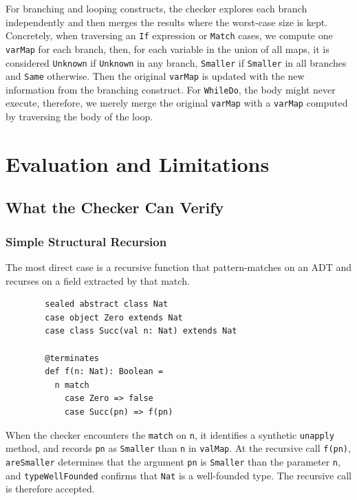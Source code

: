 For branching and looping constructs, the checker explores each branch
independently and then merges the results where the worst-case size is kept.
Concretely, when traversing an \texttt{If} expression or \texttt{Match} cases,
we compute one \texttt{varMap} for each branch, then, for each variable in the
union of all maps, it is considered \texttt{Unknown} if \texttt{Unknown} in
any branch, \texttt{Smaller} if \texttt{Smaller} in all branches and
\texttt{Same} otherwise. Then the original \texttt{varMap} is updated with the
new information from the branching construct.
For \texttt{WhileDo}, the body might never execute, therefore, we merely merge
the original \texttt{varMap} with a \texttt{varMap} computed by traversing the
body of the loop.


\chapter{Evaluation and Limitations}

\section{What the Checker Can Verify}

\subsection{Simple Structural Recursion}
The most direct case is a recursive function that pattern-matches on an ADT and
recurses on a field extracted by that match.
\begin{verbatim}
        sealed abstract class Nat
        case object Zero extends Nat
        case class Succ(val n: Nat) extends Nat

        @terminates
        def f(n: Nat): Boolean =
          n match
            case Zero => false
            case Succ(pn) => f(pn)
\end{verbatim}
When the checker encounters the \texttt{match} on \texttt{n}, it identifies a
synthetic \texttt{unapply} method, and records \texttt{pn} as \texttt{Smaller}
than \texttt{n} in \texttt{valMap}.
At the recursive call \texttt{f(pn)}, \texttt{areSmaller} determines that the
argument \texttt{pn} is \texttt{Smaller} than the parameter \texttt{n}, and
\texttt{typeWellFounded} confirms that \texttt{Nat} is a well-founded type.
The recursive call is therefore accepted.

